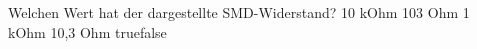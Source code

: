     {Welchen Wert hat der dargestellte SMD-Widerstand?}
    {10 kOhm}
    {103 Ohm}
    {1 kOhm}
    {10,3 Ohm}
    {true}{false}